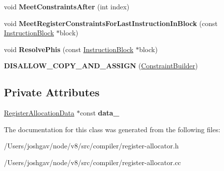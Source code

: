 \begin{DoxyCompactItemize}
\item 
void {\bfseries Meet\+Constraints\+After} (int index)\hypertarget{classv8_1_1internal_1_1compiler_1_1_constraint_builder_a9128b3ab160350657192360ad269ccc3}{}\label{classv8_1_1internal_1_1compiler_1_1_constraint_builder_a9128b3ab160350657192360ad269ccc3}

\item 
void {\bfseries Meet\+Register\+Constraints\+For\+Last\+Instruction\+In\+Block} (const \hyperlink{classv8_1_1internal_1_1compiler_1_1_instruction_block}{Instruction\+Block} $\ast$block)\hypertarget{classv8_1_1internal_1_1compiler_1_1_constraint_builder_a02a818d6d35a4f72a57a36f35728fda6}{}\label{classv8_1_1internal_1_1compiler_1_1_constraint_builder_a02a818d6d35a4f72a57a36f35728fda6}

\item 
void {\bfseries Resolve\+Phis} (const \hyperlink{classv8_1_1internal_1_1compiler_1_1_instruction_block}{Instruction\+Block} $\ast$block)\hypertarget{classv8_1_1internal_1_1compiler_1_1_constraint_builder_aea93f25291a39beb1cf1271bdbb89699}{}\label{classv8_1_1internal_1_1compiler_1_1_constraint_builder_aea93f25291a39beb1cf1271bdbb89699}

\item 
{\bfseries D\+I\+S\+A\+L\+L\+O\+W\+\_\+\+C\+O\+P\+Y\+\_\+\+A\+N\+D\+\_\+\+A\+S\+S\+I\+GN} (\hyperlink{classv8_1_1internal_1_1compiler_1_1_constraint_builder}{Constraint\+Builder})\hypertarget{classv8_1_1internal_1_1compiler_1_1_constraint_builder_a957870cb8f37f956de8b3e6fbab6182f}{}\label{classv8_1_1internal_1_1compiler_1_1_constraint_builder_a957870cb8f37f956de8b3e6fbab6182f}

\end{DoxyCompactItemize}
\subsection*{Private Attributes}
\begin{DoxyCompactItemize}
\item 
\hyperlink{classv8_1_1internal_1_1compiler_1_1_register_allocation_data}{Register\+Allocation\+Data} $\ast$const {\bfseries data\+\_\+}\hypertarget{classv8_1_1internal_1_1compiler_1_1_constraint_builder_aaf13b3b691b0f28e5da20d235cd66b8b}{}\label{classv8_1_1internal_1_1compiler_1_1_constraint_builder_aaf13b3b691b0f28e5da20d235cd66b8b}

\end{DoxyCompactItemize}


The documentation for this class was generated from the following files\+:\begin{DoxyCompactItemize}
\item 
/\+Users/joshgav/node/v8/src/compiler/register-\/allocator.\+h\item 
/\+Users/joshgav/node/v8/src/compiler/register-\/allocator.\+cc\end{DoxyCompactItemize}

